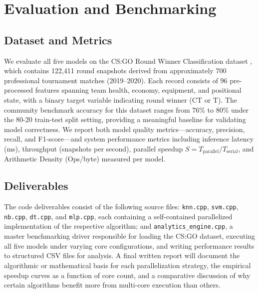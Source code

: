 \documentclass[conference]{IEEEtran}
\begin{document}
\section{Evaluation and Benchmarking}

\subsection{Dataset and Metrics}

We evaluate all five models on the CS:GO Round Winner Classification dataset \cite{lillelund2020csgo}, which contains 122,411 round snapshots derived from approximately 700 professional tournament matches (2019--2020). Each record consists of 96 pre-processed features spanning team health, economy, equipment, and positional state, with a binary target variable indicating round winner (CT or T). The community benchmark accuracy for this dataset ranges from 76\% to 80\% under the 80-20 train-test split setting, providing a meaningful baseline for validating model correctness. We report both model quality metrics---accuracy, precision, recall, and F1-score---and system performance metrics including inference latency (ms), throughput (snapshots per second), parallel speedup $S = T_{\text{parallel}} / T_{\text{serial}}$, and Arithmetic Density (Ops/byte) measured per model.

\subsection{Deliverables}

The code deliverables consist of the following source files: \texttt{knn.cpp}, \texttt{svm.cpp}, \texttt{nb.cpp}, \texttt{dt.cpp}, and \texttt{mlp.cpp}, each containing a self-contained parallelized implementation of the respective algorithm; and \texttt{analytics\_engine.cpp}, a master benchmarking driver responsible for loading the CS:GO dataset, executing all five models under varying core configurations, and writing performance results to structured CSV files for analysis. A final written report will document the algorithmic or mathematical basis for each parallelization strategy, the empirical speedup curves as a function of core count, and a comparative discussion of why certain algorithms benefit more from multi-core execution than others.



\end{document}
